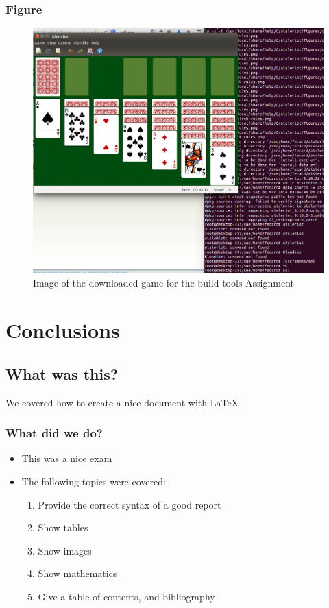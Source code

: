 \documentclass[12pt]{report}
\begin{document}
		\subsection{Figure}
			\begin{figure}[h!] \label{sec:image}
				\begin{center}
					\includegraphics[scale=0.2]{sol.png}
					\caption{Image of the downloaded game for the build tools Assignment}
				\end{center}
			\end{figure}
			
			
\chapter{Conclusions}
	\section{What was this?}
	We covered how to create a nice document with \LaTeX
		\subsection{What did we do?}
			\begin{itemize}
				\item This was a nice exam
				\item The following topics were covered:
				\begin{enumerate}
					\item Provide the correct syntax of a good report 
					\item Show tables 
					\item Show images 
					\item Show mathematics
					\item Give a table of contents, and bibliography
				\end{enumerate}
			\end{itemize}
\end{document}
